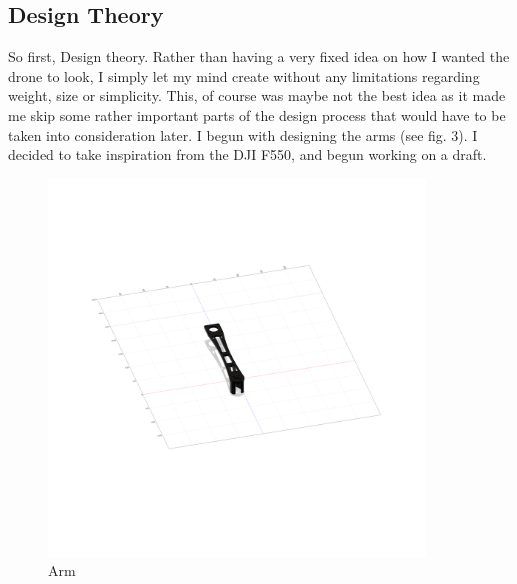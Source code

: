 \documentclass{hitec}
\begin{document}
	\subsection{Design Theory}
	So first, Design theory.\newline
	Rather than having a very fixed idea on how I wanted the drone to look, I simply let my mind create without any limitations regarding weight, size or simplicity. This, of course was maybe not the best idea as it made me skip some rather important parts of the design process that would have to be taken into consideration later.\newline
	I begun with designing the arms (see fig. 3). I decided to take inspiration from the DJI F550, and begun working on a draft. \newline
	\begin{figure}[h]
		\centering
		\includegraphics[width=100mm]{arm}
		\caption{Arm}
		\label{fig:arm}
	\end{figure}
	\pagebreak
	
\end{document}
